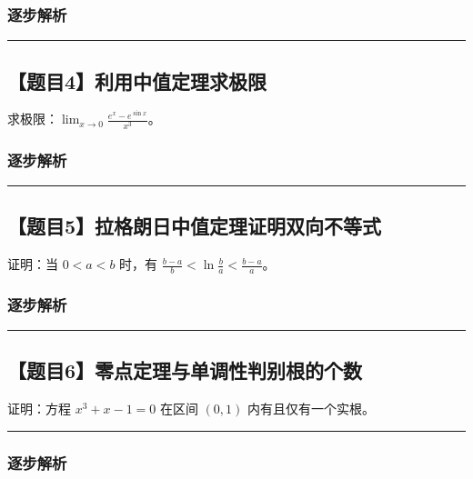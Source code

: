 \documentclass[UTF8]{ctexart}
\newenvironment{redenv}{\color{red}}{}
\newcommand{\problemrule}{\noindent\rule{\textwidth}{1.5pt}\vspace{-0.8em}}
\newcommand{\analysisrule}{\noindent\rule{\textwidth}{0.8pt}\vspace{-0.8em}}
\begin{document}
\begin{redenv}
\subsubsection*{逐步解析}
\vspace{8cm} %
\end{redenv}

\vspace{2em}
\problemrule
\subsection*{【题目4】利用中值定理求极限}
求极限：$\lim_{x \to 0} \frac{e^x - e^{\sin x}}{x^3}$。

\begin{redenv}
\subsubsection*{逐步解析}
\vspace{8cm} %
\end{redenv}

\vspace{2em}
\problemrule
\subsection*{【题目5】拉格朗日中值定理证明双向不等式}
证明：当 $0 < a < b$ 时，有 $\frac{b-a}{b} < \ln \frac{b}{a} < \frac{b-a}{a}$。

\begin{redenv}
\subsubsection*{逐步解析}
\vspace{8cm} %
\end{redenv}

\vspace{2em}
\problemrule
\subsection*{【题目6】零点定理与单调性判别根的个数}
证明：方程 $x^3 + x - 1 = 0$ 在区间 $(0, 1)$ 内有且仅有一个实根。

\begin{redenv}
\analysisrule
\subsubsection*{逐步解析}
\vspace{6cm} %
\end{redenv}
\end{document}
